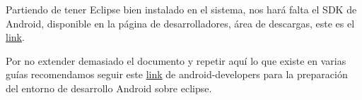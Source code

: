 \documentclass[12 pt, a4paper, twoside]{article}
\begin{document}
Partiendo de tener Eclipse bien instalado en el sistema, nos hará
falta el SDK de Android, disponible en la página de desarrolladores,
área de descargas, este es el \href{
  http://developer.android.com/sdk/index.html}{link}.

Por no extender demasiado el documento y repetir aquí lo que existe en
varias guías recomendamos seguir este
\href{http://developer.android.com/sdk/eclipse-adt.html#installing}{link}
de android-developers para la preparación del entorno de desarrollo
Android sobre eclipse.













\end{document}
